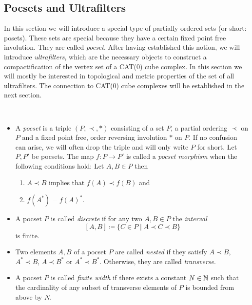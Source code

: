 \subsection{Pocsets and Ultrafilters}
\label{sec:pocset}

In this section we will introduce a special type of partially ordered sets (or short: posets). These sets are special because they have a certain fixed point free involution. They are called \emph{pocset}. After having established this notion, we will introduce \emph{ultrafilters}, which are the necessary objects to construct a compactification of the vertex set of a CAT(0) cube complex. In this section we will mostly be interested in topological and metric properties of the set of all ultrafilters. The connection to CAT(0) cube complexes will be established in the next section.

\begin{defin}~\vspace{-6pt}
  \begin{itemize}
  \item A \emph{pocset} is a triple \((P, \prec, \ast)\) consisting of a set \(P\), a partial ordering \(\prec\) on \(P\) and a fixed point free, order reversing involution \(\ast\) on \(P\). If no confusion can arise, we will often drop the triple and will only write \(P\) for short. Let \(P,P'\) be pocsets. The map \(f \colon P \to P'\) is called a \emph{pocset morphism} when the following conditions hold: Let \(A,B \in P\) then
    \begin{enumerate}
    \item \(A \prec B\) implies that \(f(A) \prec f(B)\) and
    \item \(f(A^\ast) = f(A)^\ast\). 
    \end{enumerate}
  \item A pocset \(P\) is called \emph{discrete} if for any two \(A, B \in P\) the \emph{interval}
    \[
      [A,B] \coloneqq \{C \in P \mid A \prec C \prec B\}
    \]
    is finite.
  \item Two elements \(A,B\) of a pocset \(P\) are called \emph{nested} if they satisfy \(A \prec B\), \(A^\ast \prec B\), \(A \prec B^\ast\) or \(A^\ast \prec B^\ast\). Otherwise, they are called \emph{transverse}.
  \item A pocset \(P\) is called \emph{finite width} if there exists a constant \(N \in \mathbb{N}\) such that the cardinality of any subset of transverse elements of \(P\) is bounded from above by \(N\).
  \end{itemize}
\end{defin}

